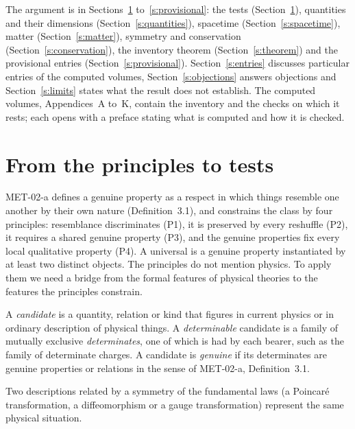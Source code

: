\documentclass{situationist-preprint}
\begin{document}
The argument is in Sections~\ref{s:tests} to~\ref{s:provisional}: the tests (Section~\ref{s:tests}), quantities and their dimensions (Section~\ref{s:quantities}), spacetime (Section~\ref{s:spacetime}), matter (Section~\ref{s:matter}), symmetry and conservation (Section~\ref{s:conservation}), the inventory theorem (Section~\ref{s:theorem}) and the provisional entries (Section~\ref{s:provisional}). Section~\ref{s:entries} discusses particular entries of the computed volumes, Section~\ref{s:objections} answers objections and Section~\ref{s:limits} states what the result does not establish. The computed volumes, Appendices~A to~K, contain the inventory and the checks on which it rests; each opens with a preface stating what is computed and how it is checked.

\section{From the principles to tests}\label{s:tests}

MET-02-a defines a genuine property as a respect in which things resemble one another by their own nature (Definition~3.1), and constrains the class by four principles: resemblance discriminates (P1), it is preserved by every reshuffle (P2), it requires a shared genuine property (P3), and the genuine properties fix every local qualitative property (P4). A universal is a genuine property instantiated by at least two distinct objects. The principles do not mention physics. To apply them we need a bridge from the formal features of physical theories to the features the principles constrain.

\begin{definition}\label{d:candidate}
A \emph{candidate} is a quantity, relation or kind that figures in current physics or in ordinary description of physical things. A \emph{determinable} candidate is a family of mutually exclusive \emph{determinates}, one of which is had by each bearer, such as the family of determinate charges. A candidate is \emph{genuine} if its determinates are genuine properties or relations in the sense of MET-02-a, Definition~3.1.
\end{definition}

\begin{assumption}[Redescription]\label{a:redescription}
Two descriptions related by a symmetry of the fundamental laws (a Poincar\'e transformation, a diffeomorphism or a gauge transformation) represent the same physical situation.
\end{assumption}
\end{document}
